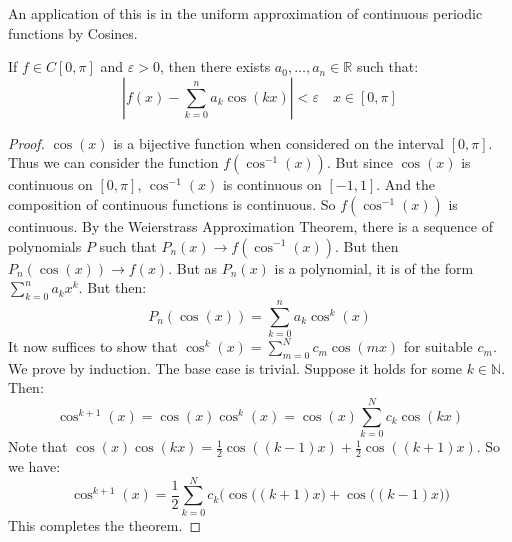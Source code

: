 \documentclass[crop=false,class=book,oneside]{standalone}
\begin{document}
            An application of this is in the uniform
            approximation of continuous periodic functions
            by Cosines.
        \begin{theorem}
            If $f\in{C[0,\pi]}$ and $\varepsilon>0$,
            then there exists
            $a_{0},\hdots,a_{n}\in\mathbb{R}$ such that:
            \begin{equation*}
                |f(x)-\sum_{k=0}^{n}a_{k}\cos(kx)|
                <\varepsilon\quad{x\in[0,\pi]}
            \end{equation*}
        \end{theorem}
        \begin{proof}
            $\cos(x)$ is a bijective function when considered on
            the interval $[0,\pi]$. Thus we can consider the
            function $f(\cos^{-1}(x))$. But since $\cos(x)$ is
            continuous on $[0,\pi]$, $\cos^{-1}(x)$ is
            continuous on $[-1,1]$. And the composition of
            continuous functions is continuous. So
            $f(\cos^{-1}(x))$ is continuous. By the
            Weierstrass Approximation Theorem, there is a
            sequence of polynomials $P$ such that
            $P_{n}(x)\rightarrow{f(\cos^{-1}(x))}$. But then
            $P_{n}(\cos(x))\rightarrow{f(x)}$. But as $P_{n}(x)$
            is a polynomial, it is of the form
            $\sum_{k=0}^{n}a_{k}x^{k}$. But then:
            \begin{equation*}
                P_{n}(\cos(x))=\sum_{k=0}^{n}a_{k}\cos^{k}(x)    
            \end{equation*}
            It now suffices to show that
            $\cos^{k}(x)=\sum_{m=0}^{N}c_{m}\cos(mx)$ for
            suitable $c_{m}$. We prove by induction.
            The base case is trivial. Suppose it holds
            for some $k\in\mathbb{N}$.
            Then:
            \begin{equation*}
                \cos^{k+1}(x)=\cos(x)\cos^{k}(x)
                =\cos(x)\sum_{k=0}^{N}c_{k}\cos(kx)
            \end{equation*}
            Note that
            $\cos(x)\cos(kx)%
             =\frac{1}{2}\cos((k-1)x)+\frac{1}{2}\cos((k+1)x)$.
            So we have:
            \begin{equation*}
                \cos^{k+1}(x)
                =\frac{1}{2}\sum_{k=0}^{N}c_{k}
                \bigg(
                    \cos\Big((k+1)x\Big)+\cos\Big((k-1)x\Big)
                \bigg)
            \end{equation*}
            This completes the theorem.
        \end{proof}
\end{document}
